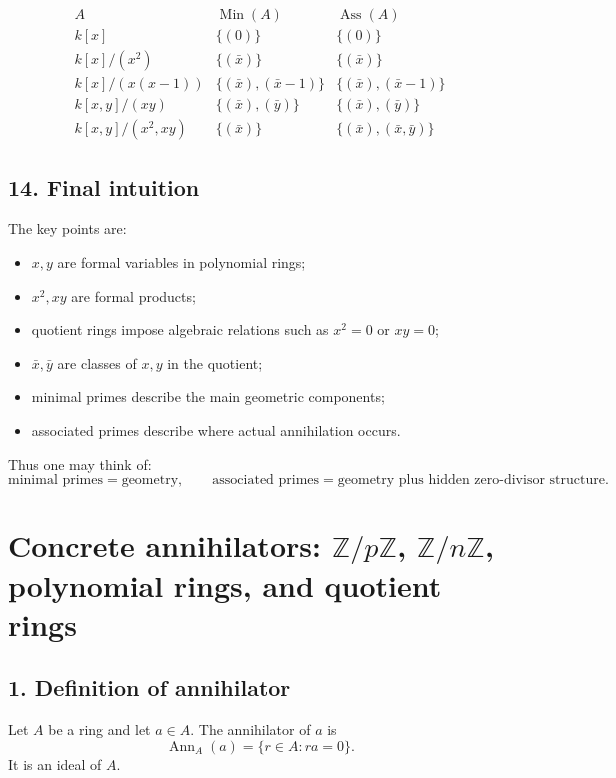 \documentclass[12pt,a4paper,oneside]{report}
\DeclareMathOperator{\Ass}{Ass}
\DeclareMathOperator{\Ann}{Ann}
\DeclareMathOperator{\Min}{Min}
\theoremstyle{notespace}
\begin{document}
	\[
	\begin{array}{c|c|c}
		A & \Min(A) & \Ass(A)\\
		\hline
		k[x] & \{(0)\} & \{(0)\}\\[4pt]
		k[x]/(x^2) & \{(\bar x)\} & \{(\bar x)\}\\[4pt]
		k[x]/(x(x-1)) & \{(\bar x),(\bar x-1)\} & \{(\bar x),(\bar x-1)\}\\[4pt]
		k[x,y]/(xy) & \{(\bar x),(\bar y)\} & \{(\bar x),(\bar y)\}\\[4pt]
		k[x,y]/(x^2,xy) & \{(\bar x)\} & \{(\bar x),(\bar x,\bar y)\}
	\end{array}
	\]
	
	\subsection{14. Final intuition}
	
	The key points are:
	
	\begin{itemize}
		\item \(x,y\) are formal variables in polynomial rings;
		\item \(x^2,xy\) are formal products;
		\item quotient rings impose algebraic relations such as \(x^2=0\) or \(xy=0\);
		\item \(\bar x,\bar y\) are classes of \(x,y\) in the quotient;
		\item minimal primes describe the main geometric components;
		\item associated primes describe where actual annihilation occurs.
	\end{itemize}
	
	Thus one may think of:
	\[
	\text{minimal primes}=\text{geometry},
	\qquad
	\text{associated primes}=\text{geometry plus hidden zero-divisor structure}.
	\]
	
	
	\section{Concrete annihilators: \(\mathbb Z/p\mathbb Z\), \(\mathbb Z/n\mathbb Z\), polynomial rings, and quotient rings}
	
	\subsection{1. Definition of annihilator}
	
	Let \(A\) be a ring and let \(a\in A\). The annihilator of \(a\) is
	\[
	\Ann_A(a)=\{r\in A:ra=0\}.
	\]
	It is an ideal of \(A\).
	
\end{document}
